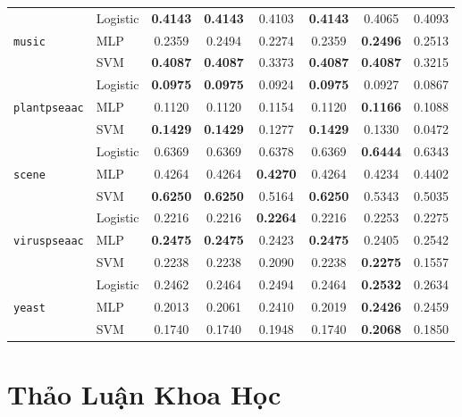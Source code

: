 \documentclass[11pt,a4paper]{article}
\begin{document}
\begin{table}[htbp]
{\begin{tabular}{l l c c c c c c}
\midrule
\multirow{3}{*}{\texttt{music}} 
& Logistic & \textbf{0.4143} & \textbf{0.4143} & 0.4103 & \textbf{0.4143} & 0.4065 & 0.4093 \\
& MLP & 0.2359 & 0.2494 & 0.2274 & 0.2359 & \textbf{0.2496} & 0.2513 \\
& SVM & \textbf{0.4087} & \textbf{0.4087} & 0.3373 & \textbf{0.4087} & \textbf{0.4087} & 0.3215 \\
\midrule
\multirow{3}{*}{\texttt{plantpseaac}} 
& Logistic & \textbf{0.0975} & \textbf{0.0975} & 0.0924 & \textbf{0.0975} & 0.0927 & 0.0867 \\
& MLP & 0.1120 & 0.1120 & 0.1154 & 0.1120 & \textbf{0.1166} & 0.1088 \\
& SVM & \textbf{0.1429} & \textbf{0.1429} & 0.1277 & \textbf{0.1429} & 0.1330 & 0.0472 \\
\midrule
\multirow{3}{*}{\texttt{scene}} 
& Logistic & 0.6369 & 0.6369 & 0.6378 & 0.6369 & \textbf{0.6444} & 0.6343 \\
& MLP & 0.4264 & 0.4264 & \textbf{0.4270} & 0.4264 & 0.4234 & 0.4402 \\
& SVM & \textbf{0.6250} & \textbf{0.6250} & 0.5164 & \textbf{0.6250} & 0.5343 & 0.5035 \\
\midrule
\multirow{3}{*}{\texttt{viruspseaac}} 
& Logistic & 0.2216 & 0.2216 & \textbf{0.2264} & 0.2216 & 0.2253 & 0.2275 \\
& MLP & \textbf{0.2475} & \textbf{0.2475} & 0.2423 & \textbf{0.2475} & 0.2405 & 0.2542 \\
& SVM & 0.2238 & 0.2238 & 0.2090 & 0.2238 & \textbf{0.2275} & 0.1557 \\
\midrule
\multirow{3}{*}{\texttt{yeast}} 
& Logistic & 0.2462 & 0.2464 & 0.2494 & 0.2464 & \textbf{0.2532} & 0.2634 \\
& MLP & 0.2013 & 0.2061 & 0.2410 & 0.2019 & \textbf{0.2426} & 0.2459 \\
& SVM & 0.1740 & 0.1740 & 0.1948 & 0.1740 & \textbf{0.2068} & 0.1850 \\
\bottomrule
\end{tabular}%
}
\end{table}

\section{Thảo Luận Khoa Học}
\end{document}
